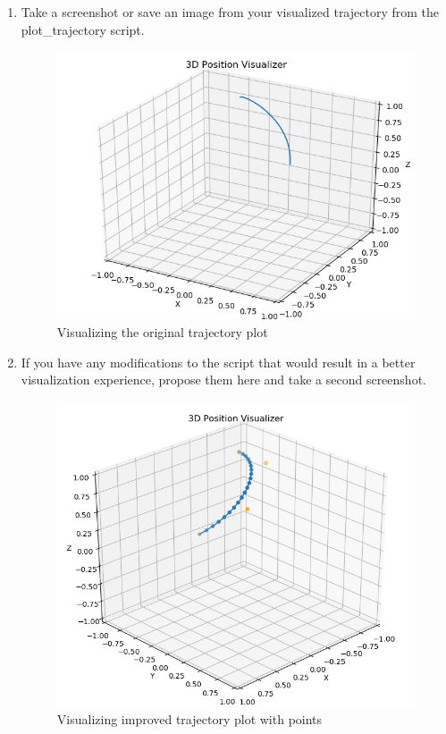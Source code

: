 \documentclass[12pt]{article}
\begin{document}
\begin{enumerate}
    \item Take a screenshot or save an image from your visualized trajectory from the plot\_trajectory script.
    
    \begin{figure}[H]
        \vspace{-10pt}
        \centering\includegraphics[width=12cm]{images/plot_traj.png}
        \caption{Visualizing the original trajectory plot}\label{fig:plot_traj}
    \end{figure}
    
    \item If you have any modifications to the script that would result in a better visualization experience, propose them here and take a second screenshot.
    
    \begin{figure}[H]
        \vspace{-10pt}
        \centering\includegraphics[width=14cm]{images/plot_traj_mod.png}
        \caption{Visualizing improved trajectory plot with points}\label{fig:plot_traj_mod}
    \end{figure}


\end{enumerate}
\end{document}
